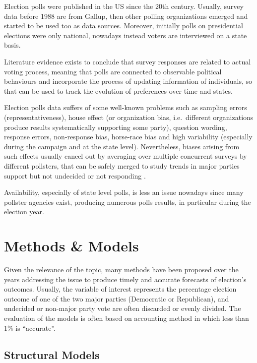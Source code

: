 \documentclass[
  12pt]{article}
\begin{document}
Election polls were published in the US since the 20th century. Usually,
survey data before 1988 are from Gallup, then other polling
organizations emerged and started to be used too as data sources.
Moreover, initially polls on presidential elections were only national,
nowadays instead voters are interviewed on a state basis.

Literature evidence exists to conclude that survey responses are related
to actual voting process, meaning that polls are connected to observable
political behaviours and incorporate the process of updating information
of individuals, so that can be used to track the evolution of
preferences over time and states.

Election polls data suffers of some well-known problems such as sampling
errors (representativeness), house effect (or organization bias,
i.e.~different organizations produce results systematically supporting
some party), question wording, response errors, non-response bias,
horse-race bias and high variability (especially during the campaign and
at the state level). Nevertheless, biases arising from such effects
usually cancel out by averaging over multiple concurrent surveys by
different pollsters, that can be safely merged to study trends in major
parties support but not undecided or not responding
\citep{gel:kin:1993}.

Availability, especially of state level polls, is less an issue nowadays
since many pollster agencies exist, producing numerous polls results, in
particular during the election year.

\hypertarget{methods-models}{%
\section{Methods \& Models}\label{methods-models}}

Given the relevance of the topic, many methods have been proposed over
the years addressing the issue to produce timely and accurate forecasts
of election's outcomes. Usually, the variable of interest represents the
percentage election outcome of one of the two major parties (Democratic
or Republican), and undecided or non-major party vote are often
discarded or evenly divided. The evaluation of the models is often based
on \citet{cam:1996} accounting method in which less than 1\% is
``accurate''.

\hypertarget{structural-models}{%
\subsection{Structural Models}\label{structural-models}}
\end{document}
